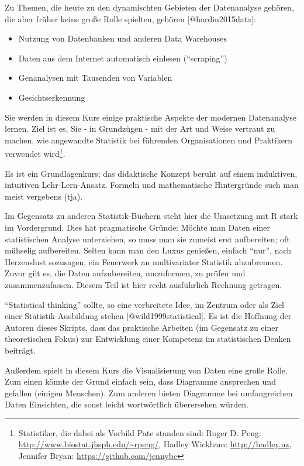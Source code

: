 \documentclass[12pt,ngerman,]{book}
\providecommand{\tightlist}{%
  \setlength{\itemsep}{0pt}\setlength{\parskip}{0pt}}
\let\rmarkdownfootnote\footnote%
\def\footnote{\protect\rmarkdownfootnote}
\begin{document}
Zu Themen, die heute zu den dynamischten Gebieten der Datenanalyse
gehören, die aber früher keine große Rolle spielten, gehören
{[}@hardin2015data{]}:

\begin{itemize}
\tightlist
\item
  Nutzung von Datenbanken und anderen Data Warehouses
\item
  Daten aus dem Internet automatisch einlesen (``scraping'')
\item
  Genanalysen mit Tausenden von Variablen
\item
  Gesichtserkennung
\end{itemize}

Sie werden in diesem Kurs einige praktische Aspekte der modernen
Datenanalyse lernen. Ziel ist es, Sie - in Grundzügen - mit der Art und
Weise vertraut zu machen, wie angewandte Statistik bei führenden
Organisationen und Praktikern verwendet wird\footnote{Statistiker, die
  dabei als Vorbild Pate standen sind: Roger D. Peng:
  \url{http://www.biostat.jhsph.edu/~rpeng/}, Hadley Wickham:
  \url{http://hadley.nz}, Jennifer Bryan:
  \url{https://github.com/jennybc}}.

Es ist ein Grundlagenkurs; das didaktische Konzept beruht auf einem
induktiven, intuitiven Lehr-Lern-Ansatz. Formeln und mathematische
Hintergründe such man meist vergebens (tja).

Im Gegensatz zu anderen Statistik-Büchern steht hier die Umsetzung mit R
stark im Vordergrund. Dies hat pragmatische Gründe: Möchte man Daten
einer statistischen Analyse unterziehen, so muss man sie zumeist erst
aufbereiten; oft mühselig aufbereiten. Selten kann man den Luxus
genießen, einfach ``nur'', nach Herzenslust sozusagen, ein Feuerwerk an
multivariater Statistik abzubrennen. Zuvor gilt es, die Daten
aufzubereiten, umzuformen, zu prüfen und zusammenzufassen. Diesem Teil
ist hier recht ausführlich Rechnung getragen.

``Statistical thinking'' sollte, so eine verbreitete Idee, im Zentrum
oder als Ziel einer Statistik-Ausbildung stehen
{[}@wild1999statistical{]}. Es ist die Hoffnung der Autoren dieses
Skripts, dass das praktische Arbeiten (im Gegensatz zu einer
theoretischen Fokus) zur Entwicklung einer Kompetenz im statistischen
Denken beiträgt.

Außerdem spielt in diesem Kurs die Visualisierung von Daten eine große
Rolle. Zum einen könnte der Grund einfach sein, dass Diagramme
ansprechen und gefallen (einigen Menschen). Zum anderen bieten Diagramme
bei umfangreichen Daten Einsichten, die sonst leicht wortwörtlich
überersehen würden.
\end{document}
